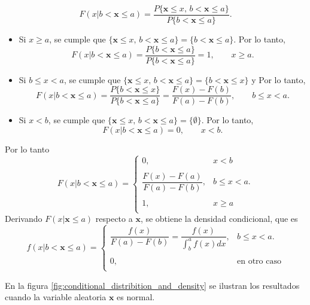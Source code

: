 \documentclass[a4paper]{report}
\newcommand{\x}{\mathbf{x}}
\begin{document}
\begin{enumerate}[I.]
 \[
  F(x|b<\x\leq a)=\frac{P\{\x\leq x,\,b<\x\leq a\}}{P\{b<\x\leq a\}}.
 \]
 \begin{itemize}
  \item Si \(x\geq a\), se cumple que \(\{\x\leq x,\,b<\x\leq a\}=\{b<\x\leq a\}\). Por lo tanto,
 \[
  F(x|b<\x\leq a)=\frac{P\{b<\x\leq a\}}{P\{b<\x\leq a\}}=1,\qquad x\geq a.
 \]
 \item Si \(b\leq x<a\), se cumple que \(\{\x\leq x,\,b<\x\leq a\}=\{b<\x\leq x\}\) y Por lo tanto,
 \[
  F(x|b<\x\leq a)=\frac{P\{b<\x\leq x\}}{P\{b<\x\leq a\}}=\frac{F(x)-F(b)}{F(a)-F(b)},\qquad b\leq x<a.
 \]
 \item Si \(x<b\), se cumple que \(\{\x\leq x,\,b<\x\leq a\}=\{\emptyset\}\). Por lo tanto,
 \[
  F(x|b<\x\leq a)=0,\qquad x<b.
 \]
 \end{itemize}
 Por lo tanto
 \begin{equation}\label{eq:rv_conditional_distribution_b_leq_x_leq_a}
  F(x|b<\x\leq a)=
 \left\{\begin{array}{ll}
  0, & x<b \\
  \\
 \dfrac{F(x)-F(a)}{F(a)-F(b)}, & b\leq x<a.\\
  \\
  1, & x\geq a \\
 \end{array} \right.
 \end{equation}
 Derivando \(F(x|\x\leq a)\) respecto a \(\x\), se obtiene la densidad condicional, que es
 \begin{equation}\label{eq:rv_conditional_density_b_leq_x_leq_a}
  f(x|b<\x\leq a)=
 \left\{\begin{array}{ll}
 \dfrac{f(x)}{F(a)-F(b)}=\dfrac{f(x)}{\int_{b}^{a}f(x)dx}, & b\leq x<a.\\
  \\
  0, & \textrm{en otro caso} \\
 \end{array} \right.
 \end{equation}
\end{enumerate}
En la figura \ref{fig:conditional_distribition_and_density} se ilustran los resultados cuando la variable aleatoria \(\x\) es normal.
\end{document}
